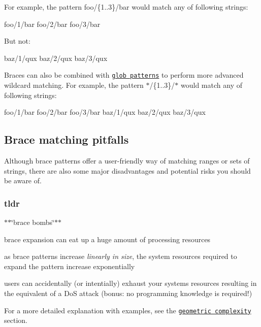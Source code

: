 For example, the pattern {\ttfamily foo/\{1..3\}/bar} would match any of following strings\+:


\begin{DoxyCode}
foo/1/bar
foo/2/bar
foo/3/bar
\end{DoxyCode}


But not\+:


\begin{DoxyCode}
baz/1/qux
baz/2/qux
baz/3/qux
\end{DoxyCode}


Braces can also be combined with \href{https://github.com/jonschlinkert/micromatch}{\tt glob patterns} to perform more advanced wildcard matching. For example, the pattern {\ttfamily $\ast$/\{1..3\}/$\ast$} would match any of following strings\+:


\begin{DoxyCode}
foo/1/bar
foo/2/bar
foo/3/bar
baz/1/qux
baz/2/qux
baz/3/qux
\end{DoxyCode}


\subsection*{Brace matching pitfalls}

Although brace patterns offer a user-\/friendly way of matching ranges or sets of strings, there are also some major disadvantages and potential risks you should be aware of.

\subsubsection*{tldr}

$\ast$$\ast$\char`\"{}brace bombs\char`\"{}$\ast$$\ast$


\begin{DoxyItemize}
\item brace expansion can eat up a huge amount of processing resources
\item as brace patterns increase {\itshape linearly in size}, the system resources required to expand the pattern increase exponentially
\item users can accidentally (or intentially) exhaust your system\textquotesingle{}s resources resulting in the equivalent of a DoS attack (bonus\+: no programming knowledge is required!)
\end{DoxyItemize}

For a more detailed explanation with examples, see the \href{#geometric-complexity}{\tt geometric complexity} section.

